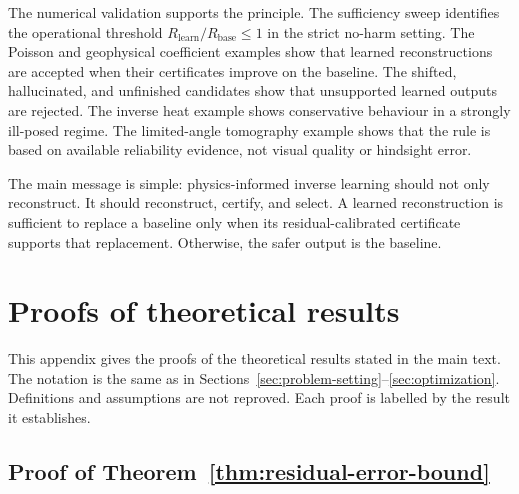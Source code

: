 \documentclass{article}
\numberwithin{equation}{section}
\theoremstyle{definition}
\begin{document}
The numerical validation supports the principle. The sufficiency sweep identifies the operational threshold \(R_{\mathrm{learn}}/R_{\mathrm{base}}\le1\) in the strict no-harm setting. The Poisson and geophysical coefficient examples show that learned reconstructions are accepted when their certificates improve on the baseline. The shifted, hallucinated, and unfinished candidates show that unsupported learned outputs are rejected. The inverse heat example shows conservative behaviour in a strongly ill-posed regime. The limited-angle tomography example shows that the rule is based on available reliability evidence, not visual quality or hindsight error.

The main message is simple: physics-informed inverse learning should not only reconstruct. It should reconstruct, certify, and select. A learned reconstruction is sufficient to replace a baseline only when its residual-calibrated certificate supports that replacement. Otherwise, the safer output is the baseline.




\appendix

\section{Proofs of theoretical results}
\label{app:theoretical-proofs}

This appendix gives the proofs of the theoretical results stated in the main text. The notation is the same as in Sections~\ref{sec:problem-setting}--\ref{sec:optimization}. Definitions and assumptions are not reproved. Each proof is labelled by the result it establishes.

\subsection{Proof of Theorem~\ref{thm:residual-error-bound}}
\end{document}
